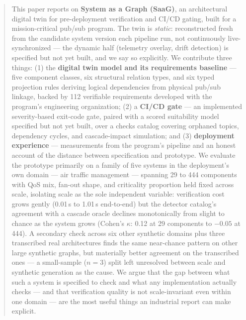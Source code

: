\documentclass[sigconf,9pt]{acmart}
\begin{document}
\begin{abstract}
This paper reports on \textbf{System as a Graph (SaaG)}, an architectural digital twin for
pre-deployment verification and CI/CD gating, built for a mission-critical pub/sub program. The
twin is \emph{static}: reconstructed fresh from the candidate system version each pipeline run, not
continuously live-synchronized --- the dynamic half (telemetry overlay, drift detection) is
specified but not yet built, and we say so explicitly. We contribute three things: (1) the
\textbf{digital twin model and its requirements baseline} --- five component classes, six structural
relation types, and six typed projection rules deriving logical dependencies from physical pub/sub
linkage, backed by 112 verifiable requirements developed with the program's engineering
organization; (2) a \textbf{CI/CD gate} --- an implemented severity-based exit-code gate, paired
with a scored suitability model specified but not yet built, over a checks catalog covering
orphaned topics, dependency cycles, and cascade-impact simulation; and (3) \textbf{deployment
experience} --- measurements from the program's pipeline and an honest account of the distance
between specification and prototype. We evaluate the prototype primarily on a family of five
systems in the deployment's own domain --- air traffic management --- spanning 29 to 444 components
with QoS mix, fan-out shape, and criticality proportion held fixed across scale, isolating scale as
the sole independent variable: verification cost grows gently (0.01\,s to 1.01\,s end-to-end) but
the detector catalog's agreement with a cascade oracle declines monotonically from slight to
chance as the system grows (Cohen's $\kappa$: 0.12 at 29 components to $-0.05$ at 444). A secondary
check across six other synthetic domains plus three transcribed real architectures finds the same
near-chance pattern on other large synthetic graphs, but materially better agreement on the
transcribed ones --- a small-sample ($n=3$) split left unresolved between scale and synthetic
generation as the cause. We argue that the gap between what such a system is specified to check and
what any implementation actually checks --- and that verification quality is not scale-invariant even
within one domain --- are the most useful things an industrial report can make explicit.
\end{abstract}


\end{document}
